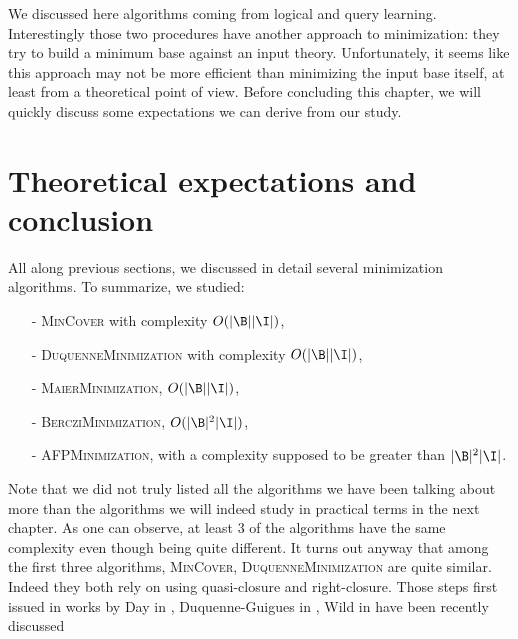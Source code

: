 We discussed here algorithms coming from logical and query learning. Interestingly those two procedures have another approach to minimization: they try to build a minimum base against an input theory. Unfortunately, it seems
like this approach may not be more efficient than minimizing
the input base itself, at least from a theoretical point of view. Before concluding this chapter, we will quickly discuss some expectations we can 
derive from our study.


\section{Theoretical expectations and conclusion}

All along previous sections, we discussed in detail several minimization
algorithms. To summarize, we studied:
\begin{itemize}
	\item[-] \textsc{MinCover} with complexity $O(|\B||\I|)$,
	\item[-] \textsc{DuquenneMinimization} with complexity $O(|\B||\I|)$,
	\item[-] \textsc{MaierMinimization}, $O(|\B||\I|)$,
	\item[-] \textsc{BercziMinimization}, $O(|\B|^2|\I|)$,
	\item[-] \textsc{AFPMinimization}, with a complexity supposed to be greater than $|\B|^2|\I|$.
\end{itemize}
\noindent Note that we did not truly listed all the algorithms we have been
talking about more than the algorithms we will indeed study in practical terms
in the next chapter. As one can observe, at least 3 of the algorithms have 
the same complexity even though being quite different. It turns out anyway that
among the first three algorithms, \textsc{MinCover, DuquenneMinimization} are
quite similar. Indeed they both rely on using quasi-closure and right-closure. Those steps first issued in works by Day in \cite{day_lattice_1992}, Duquenne-Guigues in \cite{duquenne_variations_2007, guigues_familles_1986}, Wild in \cite{wild_theory_1994, wild_computations_1995, wild_implicational_1989} have been recently discussed
